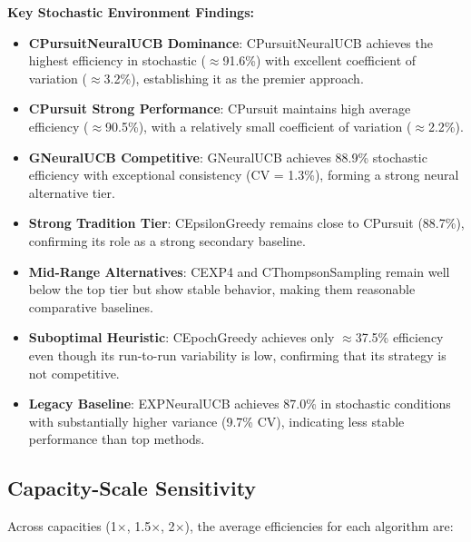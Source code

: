 \documentclass[12pt,a4paper]{article}
\newcommand{\stochastic}[1]{\textcolor{stochasticcolor}{\textbf{#1}}}
\newcommand{\critical}[1]{\textcolor{criticalcolor}{\textbf{#1}}}
\newcommand{\legacy}[1]{\textcolor{legacycolor}{\textbf{#1}}}
\newcommand{\neural}[1]{\textcolor{neuralcolor}{\textbf{#1}}}
\begin{document}
\begin{tcolorbox}[colback=stochasticcolor!10,colframe=stochasticcolor,title=\textbf{Stochastic Environment Deep Analysis (1$\times$–2$\times$ Capacities, T/Tb Combined)}]
\textbf{Key Stochastic Environment Findings:}
\begin{itemize}
\item \neural{CPursuitNeuralUCB Dominance}: CPursuitNeuralUCB achieves the highest efficiency in stochastic ($\approx$91.6\%) with excellent coefficient of variation ($\approx$3.2\%), establishing it as the premier approach.
\item \stochastic{CPursuit Strong Performance}: CPursuit maintains high average efficiency ($\approx$90.5\%), with a relatively small coefficient of variation ($\approx$2.2\%).
\item \neural{GNeuralUCB Competitive}: GNeuralUCB achieves 88.9\% stochastic efficiency with exceptional consistency (CV = 1.3\%), forming a strong neural alternative tier.
\item \stochastic{Strong Tradition Tier}: CEpsilonGreedy remains close to CPursuit (88.7\%), confirming its role as a strong secondary baseline.
\item \stochastic{Mid-Range Alternatives}: CEXP4 and CThompsonSampling remain well below the top tier but show stable behavior, making them reasonable comparative baselines.
\item \critical{Suboptimal Heuristic}: CEpochGreedy achieves only $\approx$37.5\% efficiency even though its run-to-run variability is low, confirming that its strategy is not competitive.
\item \legacy{Legacy Baseline}: EXPNeuralUCB achieves 87.0\% in stochastic conditions with substantially higher variance (9.7\% CV), indicating less stable performance than top methods.
\end{itemize}

\end{tcolorbox}


\newpage
\subsection{Capacity-Scale Sensitivity}

Across capacities (1$\times$, 1.5$\times$, 2$\times$), the average efficiencies for each algorithm are:
\end{document}
